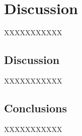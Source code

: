 \chapter{Discussion}

XXXXXXXXXXX

\section{Discussion}

XXXXXXXXXXX

\section{Conclusions}

XXXXXXXXXXX


\newpage


